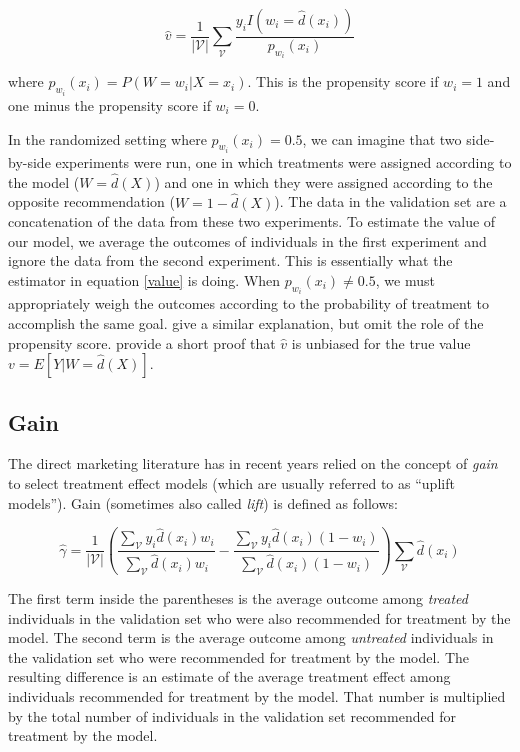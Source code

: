 \begin{equation}
\label{value}
\hat v = \frac{1}{|\mathcal{V}|}\sum_{\mathcal{V}} \frac{y_i I(w_i=\hat d(x_i))}{p_{w_i}(x_i)}
\end{equation}

where $p_{w_i}(x_i) = P(W=w_i | X=x_i)$. This is the propensity score if $w_i = 1$ and one minus the propensity score if $w_i = 0$.

In the randomized setting where $p_{w_i}(x_i) = 0.5$, we can imagine that two side-by-side experiments were run, one in which treatments were assigned according to the model ($W = \hat d(X)$) and one in which they were assigned according to the opposite recommendation ($W = 1 - \hat d(X)$). The data in the validation set are a concatenation of the data from these two experiments. To estimate the value of our model, we average the outcomes of individuals in the first experiment and ignore the data from the second experiment. This is essentially what the estimator in equation \ref{value} is doing. When $p_{w_i}(x_i) \ne 0.5$, we must appropriately weigh the outcomes according to the probability of treatment to accomplish the same goal. \citet{Kapelner:3baXYEjR} give a similar explanation, but omit the role of the propensity score. \citet{Zhao:2017wa} provide a short proof that $\hat v$ is unbiased for the true value $v = E[Y|W = \hat d(X)]$. 


\subsection{Gain}

The direct marketing literature has in recent years relied on the concept of \emph{gain} to select treatment effect models (which are usually referred to as ``uplift models''). Gain (sometimes also called \emph{lift}) is defined as follows:

\begin{equation}
\label{gain-basic}
	\hat \gamma = \frac{1}{|\mathcal V |} \left(
		  \frac{\sum_{\mathcal{V}} y_i  \hat d(x_i) w_i}{\sum_{\mathcal{V}}  \hat d(x_i) w_i} - 
		  \frac{\sum_{\mathcal{V}} y_i  \hat d(x_i) (1-w_i)}{\sum_{\mathcal{V}}  \hat d(x_i)  (1-w_i)} 
		  \right)
		  \sum_{\mathcal{V}} \hat d(x_i) 
\end{equation}

The first term inside the parentheses is the average outcome among \emph{treated} individuals in the validation set who were also recommended for treatment by the model. The second term is the average outcome among \emph{untreated} individuals in the validation set who were recommended for treatment by the model. The resulting difference is an estimate of the average treatment effect among individuals recommended for treatment by the model. That number is multiplied by the total number of individuals in the validation set recommended for treatment by the model. 

